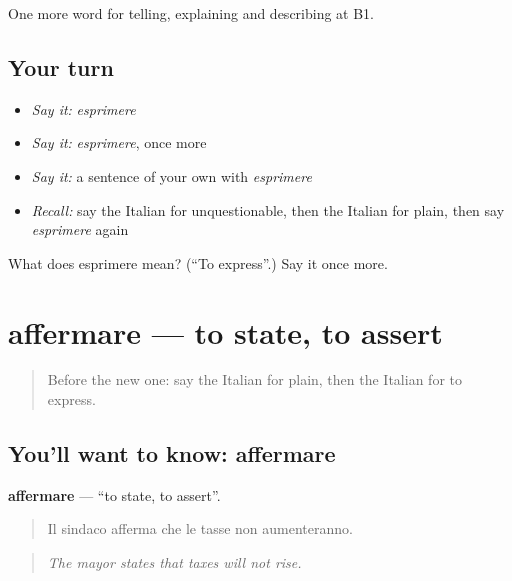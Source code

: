 \begin{grammarlens}[title={What you've built}]
One more word for telling, explaining and describing at B1.
\end{grammarlens}

\subsection*{Your turn}
\begin{itemize}
\raggedright
  \item \emph{Say it:} \emph{esprimere}
  \item \emph{Say it:} \emph{esprimere}, once more
  \item \emph{Say it:} a sentence of your own with \emph{esprimere}
  \item \emph{Recall:} say the Italian for unquestionable, then the Italian for plain, then say \emph{esprimere} again
\end{itemize}

\begin{tcolorbox}[breakable,colback=teal!4,colframe=teal!35!black,title={Before you move on}]
What does esprimere mean? (\textquotedblleft{}To express\textquotedblright{}.) Say it once more.
\end{tcolorbox}
\section[affermare]{affermare — to state, to assert}

\label{lesson:IT-C345-affermare}



\begin{quote}
Before the new one: say the Italian for plain, then the Italian for to express.
\end{quote}

\subsection*{You'll want to know: affermare}
\textbf{affermare} — \textquotedblleft{}to state, to assert\textquotedblright{}.

\begin{quote}
Il sindaco afferma che le tasse non aumenteranno.
\end{quote}

\begin{quote}
\emph{The mayor states that taxes will not rise.}
\end{quote}

